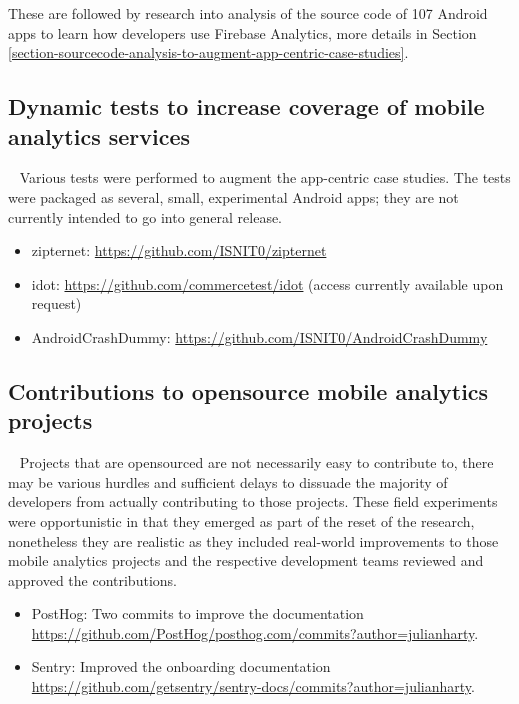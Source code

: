 These are followed by research into analysis of the source code of 107 Android apps to learn how developers use Firebase Analytics, more details in Section \ref{section-sourcecode-analysis-to-augment-app-centric-case-studies}.

\subsection{Dynamic tests to increase coverage of mobile analytics services}~\label{section-small-experimental-android-apps}
Various tests were performed to augment the app-centric case studies. The tests were packaged as several, small, experimental Android apps; they are not currently intended to go into general release.

\begin{itemize}
    \itemsep0em
    \item zipternet: \url{https://github.com/ISNIT0/zipternet}
    \item idot: \url{https://github.com/commercetest/idot} (access currently available upon request)
    \item AndroidCrashDummy: \url{https://github.com/ISNIT0/AndroidCrashDummy}
\end{itemize}

\subsection{Contributions to opensource mobile analytics projects}~\label{section-contributions-to-opensource-mobile-analytics-projects}
Projects that are opensourced are not necessarily easy to contribute to, there may be various hurdles and sufficient delays to dissuade the majority of developers from actually contributing to those projects. These field experiments were opportunistic in that they emerged as part of the reset of the research, nonetheless they are realistic as they included real-world improvements to those mobile analytics projects and the respective development teams reviewed and approved the contributions.

\begin{itemize}
    \itemsep0em
    \item PostHog: Two commits to improve the documentation \url{https://github.com/PostHog/posthog.com/commits?author=julianharty}.
    \item Sentry: Improved the onboarding documentation \url{https://github.com/getsentry/sentry-docs/commits?author=julianharty}.
\end{itemize}


